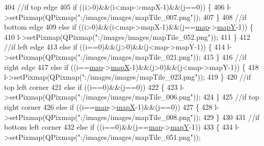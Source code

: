 \begin{DoxyCode}
404                 \textcolor{comment}{//if top edge}
405                 \textcolor{keywordflow}{if} ((i>0)&&(i<map->mapX-1)&&(j==0)) \{
406                     l->setPixmap(QPixmap(\textcolor{stringliteral}{":/images/images/mapTile\_007.png"}));
407                 \}
408                 \textcolor{comment}{//if bottom edge}
409                 \textcolor{keywordflow}{else} \textcolor{keywordflow}{if} ((i>0)&&(i<map->mapX-1)&&(j==\hyperlink{class_game_acef3a39fdf14be2c980b0dc11e7be402}{map}->\hyperlink{class_map_ae08efae9ac1453b2690985c627aca358}{mapY}-1)) \{
410                     l->setPixmap(QPixmap(\textcolor{stringliteral}{":/images/images/mapTile\_052.png"}));
411                 \}
412                 \textcolor{comment}{//if left edge}
413                 \textcolor{keywordflow}{else} \textcolor{keywordflow}{if} ((i==0)&&(j>0)&&(j<map->mapY-1)) \{
414                     l->setPixmap(QPixmap(\textcolor{stringliteral}{":/images/images/mapTile\_021.png"}));
415                 \}
416                 \textcolor{comment}{//if right edge}
417                 \textcolor{keywordflow}{else} \textcolor{keywordflow}{if} ((i==\hyperlink{class_game_acef3a39fdf14be2c980b0dc11e7be402}{map}->\hyperlink{class_map_acfd20721da29a2e353598555e23e12f0}{mapX}-1)&&(j>0)&&(j<map->mapY-1)) \{
418                     l->setPixmap(QPixmap(\textcolor{stringliteral}{":/images/images/mapTile\_023.png"}));
419                 \}
420                 \textcolor{comment}{//if top left corner}
421                 \textcolor{keywordflow}{else} \textcolor{keywordflow}{if} ((i==0)&&(j==0))
422                 \{
423                     l->setPixmap(QPixmap(\textcolor{stringliteral}{":/images/images/mapTile\_006.png"}));
424                 \}
425                 \textcolor{comment}{//if top right corner}
426                 \textcolor{keywordflow}{else} \textcolor{keywordflow}{if} ((i==\hyperlink{class_game_acef3a39fdf14be2c980b0dc11e7be402}{map}->\hyperlink{class_map_acfd20721da29a2e353598555e23e12f0}{mapX}-1)&&(j==0))
427                 \{
428                     l->setPixmap(QPixmap(\textcolor{stringliteral}{":/images/images/mapTile\_008.png"}));
429                 \}
430 
431                 \textcolor{comment}{//if bottom left corner}
432                 \textcolor{keywordflow}{else} \textcolor{keywordflow}{if} ((i==0)&&(j==\hyperlink{class_game_acef3a39fdf14be2c980b0dc11e7be402}{map}->\hyperlink{class_map_ae08efae9ac1453b2690985c627aca358}{mapY}-1))
433                 \{
434                     l->setPixmap(QPixmap(\textcolor{stringliteral}{":/images/images/mapTile\_051.png"}));

\end{DoxyCode}
